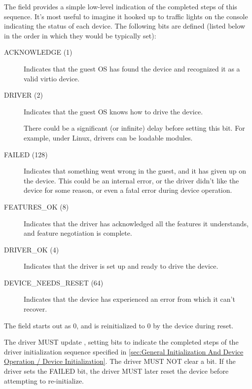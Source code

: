 The  field provides a simple low-level
indication of the completed steps of this sequence.
It's most useful to imagine it hooked up to traffic
lights on the console indicating the status of each device.  The
following bits are defined (listed below in the order in which
they would be typically set):
\begin{description}
\item[ACKNOWLEDGE (1)] Indicates that the guest OS has found the
  device and recognized it as a valid virtio device.

\item[DRIVER (2)] Indicates that the guest OS knows how to drive the
  device.
  \begin{note}
    There could be a significant (or infinite) delay before setting
    this bit.  For example, under Linux, drivers can be loadable modules.
  \end{note}

\item[FAILED (128)] Indicates that something went wrong in the guest,
  and it has given up on the device. This could be an internal
  error, or the driver didn't like the device for some reason, or
  even a fatal error during device operation.

\item[FEATURES_OK (8)] Indicates that the driver has acknowledged all the
  features it understands, and feature negotiation is complete.

\item[DRIVER_OK (4)] Indicates that the driver is set up and ready to
  drive the device.

\item[DEVICE_NEEDS_RESET (64)] Indicates that the device has experienced
  an error from which it can't recover.
\end{description}

The  field starts out as 0, and is reinitialized to 0 by
the device during reset.

The driver MUST update ,
setting bits to indicate the completed steps of the driver
initialization sequence specified in
\ref{sec:General Initialization And Device Operation / Device
Initialization}.
The driver MUST NOT clear a
 bit.  If the driver sets the FAILED bit,
the driver MUST later reset the device before attempting to re-initialize.

